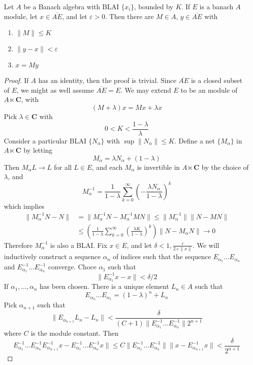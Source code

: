 \begin{theorem}
    Let $A$ be a Banach algebra with BLAI $\{ x_i \}$, bounded by $K$. If $E$ is a banach $A$ module, let $x \in \overline{AE}$, and let $\varepsilon > 0$. Then there are $M \in A$, $y \in \overline{AE}$ with
    \begin{enumerate}
        \item $\| M \| \leq K$
        \item $\| y - x \| < \varepsilon$
        \item $x = My$
    \end{enumerate}
\end{theorem}
\begin{proof}
    If $A$ has an identity, then the proof is trivial. Since $\overline{AE}$ is a closed subset of $E$, we might as well assume $\overline{AE} = E$. We may extend $E$ to be an module of $A \ltimes \mathbf{C}$, with
    \[ (M + \lambda) x = Mx + \lambda x \]
    Pick $\lambda \in \mathbf{C}$ with
    \[ 0 < K < \frac{1 - \lambda}{\lambda} \]
    Consider a particular BLAI $\{ N_\alpha \}$ with $\sup \| N_\alpha \| \leq K$. Define a net $\{ M_\alpha \}$ in $A \ltimes \mathbf{C}$ by letting
    \[ M_\alpha = \lambda N_\alpha + (1 - \lambda) \]
    Then $M_\alpha L \to L$ for all $L \in E$, and each $M_\alpha$ is invertible in $A \ltimes \mathbf{C}$ by the choice of $\lambda$, and
    \[ M_\alpha^{-1} = \frac{1}{1 - \lambda} \sum_{k = 0}^\infty \left(- \frac{\lambda N_\alpha}{1 - \lambda} \right)^k \]
    which implies
    \begin{align*}
        \| M_\alpha^{-1} N - N \| &= \| M_\alpha^{-1} N - M_\alpha^{-1} M N \| \leq \| M_\alpha^{-1} \| \| N - M N \|\\
        &\leq \left( \frac{1}{1 - \lambda} \sum_{k = 0}^\infty \left( \frac{\lambda K}{1 - \lambda} \right)^k \right) \| N - M_\alpha N \| \to 0
    \end{align*}
    Therefore $M_\alpha^{-1}$ is also a BLAI. Fix $x \in E$, and let $\delta < 1, \frac{\varepsilon}{2 + \|x\|}$. We will inductively construct a sequence $\alpha_n$ of indices such that the sequence $E_{\alpha_1} \dots E_{\alpha_n}$ and $E_{\alpha_1}^{-1} \dots E_{\alpha_n}^{-1}$ converge. Choce $\alpha_1$ such that
    \[ \| E_{\alpha_1}^{-1} x - x \| < \delta/2 \]
    If $\alpha_1, \dots, \alpha_n$ has been chosen. There is a unique element $L_n \in A$ such that
    \[  E_{\alpha_n} \dots E_{\alpha_1} = (1 - \lambda)^n + L_n \]
    Pick $\alpha_{n+1}$ such that
    \[ \| E_{\alpha_{n+1}} L_n - L_n \| < \frac{\delta}{(C + 1)\| E_{\alpha_1}^{-1} \dots E_{\alpha_n}^{-1} \| 2^{n+1}} \]
    where $C$ is the module constant. Then
    \[ E_{\alpha_1}^{-1} \dots E_{\alpha_n}^{-1} E_{\alpha_{n+1}}^{-1} x - E_{\alpha_1}^{-1} \dots E_{\alpha_n}^{-1} x \| \leq C \| E_{\alpha_1}^{-1} \dots E_{\alpha_n}^{-1} \| \| x - E_{\alpha_{n+1}}^{-1} x \| < \frac{\delta}{2^{n+1}} \]
\end{proof}




